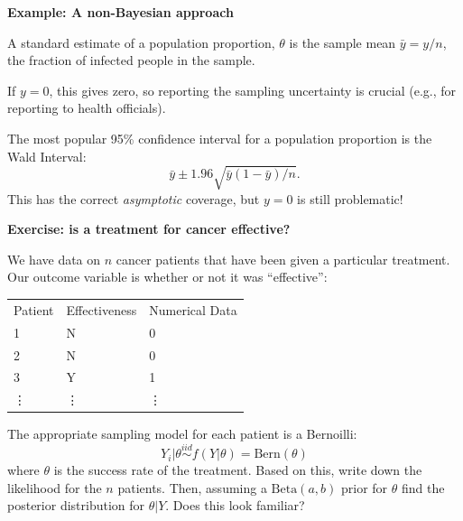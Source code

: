 \documentclass[12pt,xcolor=svgnames]{beamer}
\newcommand{\rd}{\color{red}}
\newcommand{\bl}{\color{blue}}
\newcommand{\theme}{\color{FireBrick}}
\newcommand{\fb}{\color{FireBrick}}
\newcommand{\mr}[1]{\mathrm{#1}}
\newcommand{\sk}{\vspace{.4cm}}
\newcommand{\nochap}{\vspace{0.5cm}}
\newcommand{\chap}[1]{{\theme \Large \bf #1} \sk}
\begin{document}
\begin{frame}
\chap{Example: A non-Bayesian approach}

A standard estimate of a population proportion, $\theta$ is the sample mean  $\bar{y} = y/n$, the fraction of infected people in the sample. 

\sk
If $y=0$, this gives zero, so reporting the sampling uncertainty is crucial (e.g., for reporting to health officials). 

\sk
The most popular 95\% confidence interval for a population proportion is the {\bl Wald Interval}:
\begin{equation*}
\bar{y} \pm 1.96 \sqrt{\bar{y}(1-\bar{y})/n}.
\end{equation*}
This has the correct {\it asymptotic} coverage, but {\rd $y=0$ is still problematic}!

\end{frame}


\begin{frame}
\nochap
{\bf \fb Exercise: is a treatment for cancer effective?}\\

{\footnotesize
We have data on $n$ cancer patients that have been given a particular treatment. Our outcome variable is whether or not it was ``effective'':
\begin{center}
 \begin{tabular}{lll}
Patient & Effectiveness & Numerical Data \\
1& N& 0\\
2&N&0\\
3&Y&1\\
\vdots &\vdots &\vdots \\
\end{tabular}
\end{center}
The appropriate sampling model for each patient is a Bernoilli:
$$Y_i|\theta  \stackrel{iid}{\sim} f(Y|\theta) = \text{Bern}(\theta)$$ 
where $\theta$ is the success rate of the treatment. Based on this, write down the likelihood for the $n$ patients. Then, assuming a $\mr{Beta}(a,b)$ prior for $\theta$ find the posterior distribution for $\theta|Y$. Does this look familiar?
}

\end{frame}
\end{document}
